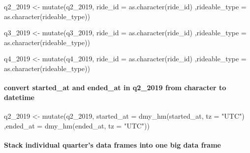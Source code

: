 \documentclass[
]{article}
\newenvironment{Shaded}{\begin{snugshade}}{\end{snugshade}}
\newcommand{\AttributeTok}[1]{\textcolor[rgb]{0.77,0.63,0.00}{#1}}
\newcommand{\FunctionTok}[1]{\textcolor[rgb]{0.00,0.00,0.00}{#1}}
\newcommand{\NormalTok}[1]{#1}
\newcommand{\OtherTok}[1]{\textcolor[rgb]{0.56,0.35,0.01}{#1}}
\newcommand{\StringTok}[1]{\textcolor[rgb]{0.31,0.60,0.02}{#1}}
\begin{document}
\begin{Shaded}
\begin{Highlighting}[]
\NormalTok{q2\_2019 }\OtherTok{\textless{}{-}}  \FunctionTok{mutate}\NormalTok{(q2\_2019, }\AttributeTok{ride\_id =} \FunctionTok{as.character}\NormalTok{(ride\_id)}
\NormalTok{                   ,}\AttributeTok{rideable\_type =} \FunctionTok{as.character}\NormalTok{(rideable\_type))}

\NormalTok{q3\_2019 }\OtherTok{\textless{}{-}}  \FunctionTok{mutate}\NormalTok{(q3\_2019, }\AttributeTok{ride\_id =} \FunctionTok{as.character}\NormalTok{(ride\_id)}
\NormalTok{                   ,}\AttributeTok{rideable\_type =} \FunctionTok{as.character}\NormalTok{(rideable\_type))}

\NormalTok{q4\_2019 }\OtherTok{\textless{}{-}}  \FunctionTok{mutate}\NormalTok{(q4\_2019, }\AttributeTok{ride\_id =} \FunctionTok{as.character}\NormalTok{(ride\_id)}
\NormalTok{                   ,}\AttributeTok{rideable\_type =} \FunctionTok{as.character}\NormalTok{(rideable\_type)) }
\end{Highlighting}
\end{Shaded}

\hypertarget{convert-started_at-and-ended_at-in-q2_2019-from-character-to-datetime}{%
\paragraph{convert started\_at and ended\_at in q2\_2019 from character
to
datetime}\label{convert-started_at-and-ended_at-in-q2_2019-from-character-to-datetime}}

\begin{Shaded}
\begin{Highlighting}[]
\NormalTok{q2\_2019 }\OtherTok{\textless{}{-}}  \FunctionTok{mutate}\NormalTok{(q2\_2019, }\AttributeTok{started\_at =} \FunctionTok{dmy\_hm}\NormalTok{(started\_at, }\AttributeTok{tz =} \StringTok{"UTC"}\NormalTok{)}
\NormalTok{                   ,}\AttributeTok{ended\_at =} \FunctionTok{dmy\_hm}\NormalTok{(ended\_at, }\AttributeTok{tz =} \StringTok{"UTC"}\NormalTok{))}
\end{Highlighting}
\end{Shaded}

\hypertarget{stack-individual-quarters-data-frames-into-one-big-data-frame}{%
\paragraph{Stack individual quarter's data frames into one big data
frame}\label{stack-individual-quarters-data-frames-into-one-big-data-frame}}
\end{document}
